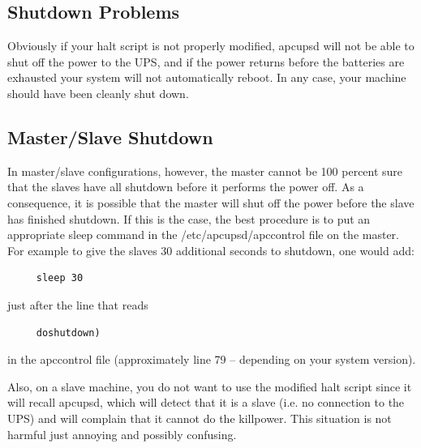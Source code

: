 {{{{{{{{{\label{Shutdown-Problems}

\subsection*{Shutdown Problems}

Obviously if your halt script is not properly modified, apcupsd will not be
able to shut off the power to the UPS, and if the power returns before the
batteries are exhausted your system will not automatically reboot. In any
case, your machine should have been cleanly shut down. 

\label{Master_002fSlave-Shutdown-_003c1_003e}

\subsection*{Master/Slave Shutdown}

In master/slave configurations, however, the master cannot be 100 percent sure
that the slaves have all shutdown before it performs the power off. As a
consequence, it is possible that the master will shut off the power before the
slave has finished shutdown. If this is the case, the best procedure is to put
an appropriate sleep command in the /etc/apcupsd/apccontrol file on the
master. For example to give the slaves 30 additional seconds to shutdown, one
would add: 

\footnotesize
\begin{verbatim}
     sleep 30
\end{verbatim}
\normalsize

just after the line that reads 

\footnotesize
\begin{verbatim}
     doshutdown)
\end{verbatim}
\normalsize

in the apccontrol file (approximately line 79 {--} depending on your system
version).  

Also, on a slave machine, you do not want to use the modified halt script
since it will recall apcupsd, which will detect that it is a slave (i.e. no
connection to the UPS) and will complain that it cannot do the killpower. This
situation is not harmful just annoying and possibly confusing.  

}}}}}}}}}
